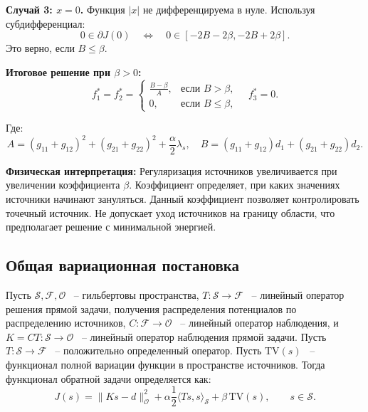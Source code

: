 \documentclass[a4paper,14pt,oneside,openany]{extarticle}
\begin{document}
\textbf{Случай 3: $x = 0$.} Функция $|x|$ не дифференцируема в нуле. Используя субдифференциал:
\begin{equation}
    0 \in \partial J(0) \quad \Leftrightarrow \quad 0 \in [-2B - 2\beta, -2B + 2\beta].
\end{equation}
Это верно, если $B \leq \beta$.

\textbf{Итоговое решение при $\beta > 0$:}
\begin{equation}
    f^*_1 = f^*_2 = \begin{cases}
    \frac{B - \beta}{A}, & \text{если } B > \beta, \\[6pt]
    0, & \text{если } B \leq \beta,
    \end{cases} \quad f^*_3 = 0.
\end{equation}

Где:
\begin{equation}
    A = (g_{11}+g_{12})^2 + (g_{21}+g_{22})^2 + \frac{\alpha}{2} \lambda_s, 
    \quad B = (g_{11}+g_{12})d_1 + (g_{21}+g_{22})d_2.
\end{equation}

\textbf{Физическая интерпретация:} 
Регуляризация источников увеличивается при увеличении коэффициента $\beta$. Коэффициент определяет,
 при каких значениях источники начинают зануляться.
Данный коэффициент позволяет контролировать точечный источник. Не допускает уход источников на 
границу области, что предполагает решение с минимальной энергией.
\subsection{Общая вариационная постановка}

Пусть $\mathcal{S},\mathcal{F},\mathcal{O}$ ~-- гильбертовы пространства, $T:\mathcal{S}\to\mathcal{F}$ ~-- 
линейный оператор решения прямой задачи, получения распределения потенциалов по распределению 
источников, $C:\mathcal{F}\to\mathcal{O}$ ~-- линейный оператор 
наблюдения, и $K=C T:\mathcal{S}\to\mathcal{O}$ ~-- линейный оператор наблюдения прямой задачи. Пусть 
$T:\mathcal{S}\to\mathcal{F}$ ~-- положительно определенный оператор.
Пусть $\mathrm{TV}(s)$ ~-- функционал полной вариации функции в пространстве источников.
Тогда функционал обратной задачи определяется как:
\begin{equation}\label{eq:general_functional}
    J(s)=\|K s - d\|_{\mathcal{O}}^2 + \alpha \frac12 \langle T s, s\rangle_{\mathcal{S}} + \beta \,\mathrm{TV}(s),
    \qquad s\in \mathcal{S}.
\end{equation}
\end{document}
